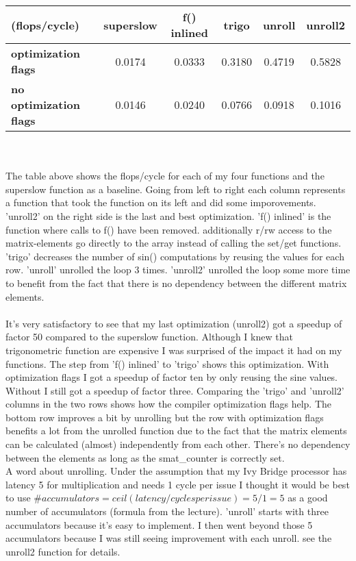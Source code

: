\documentclass[10pt,a4paper,oneside,notitlepage]{report}
\begin{document}
\begin{tabular}{|l|c|c|c|c|c|}
\hline 
\rowcolor{gray!30} 
 (flops/cycle) & \textbf{superslow} & \textbf{f() inlined} & \textbf{trigo} & \textbf{unroll} & \textbf{unroll2} \\ 
\hline 
\cellcolor{gray!30} \textbf{optimization flags} & 0.0174 & 0.0333 & 0.3180 & 0.4719 & 0.5828 \\ 
\hline 
\cellcolor{gray!30} \textbf{no optimization flags} & 0.0146 & 0.0240 & 0.0766 & 0.0918 & 0.1016 \\ 
\hline 
\end{tabular}  \\ \\
The table above shows the flops/cycle for each of my four functions and the superslow function as a baseline. Going from left to right each column represents a function that took the function on its left and did some imporovements. 'unroll2' on the right side is the last and best optimization. 'f() inlined' is the function where calls to f() have been removed. additionally r/rw access to the matrix-elements go directly to the array instead of calling the set/get functions. 'trigo' decreases the number of sin() computations by reusing the values for each row. 'unroll' unrolled the loop 3 times. 'unroll2' unrolled the loop some more time to benefit from the fact that there is no dependency between the different matrix elements.
\\ \\
It's very satisfactory to see that my last optimization (unroll2) got a speedup of factor 50 compared to the superslow function. Although I knew that trigonometric function are expensive I was surprised of the impact it had on my functions.  The step from 'f() inlined' to 'trigo' shows this optimization. With optimization flags I got a speedup of factor ten by only reusing the sine values. Without I still got a speedup of factor three. Comparing the 'trigo' and 'unroll2' columns in the two rows shows how the compiler optimization flags help. The bottom row improves a bit by unrolling but the row with optimization flags benefits a lot from the unrolled function due to the fact that the matrix elements can be calculated  (almost) independently from each other. There's no dependency between the elements as long as the  smat\_counter is correctly set. \\

A word about unrolling. Under the assumption that my Ivy Bridge processor has latency 5 for multiplication and needs 1 cycle per issue I thought it would be best to use $\#accumulators = ceil(latency/cycles per issue) = 5 / 1 = 5$ as a good number of accumulators (formula from the lecture). 'unroll' starts with three accumulators because it's easy to implement. I then went beyond those 5 accumulators because I was still seeing improvement with each unroll. see the unroll2 function for details.
\end{document}
